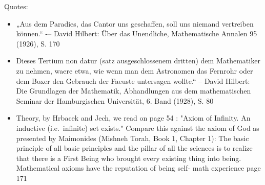 \documentclass[hidelinks]{article}
\theoremstyle{plain}
\theoremstyle{definition}
\theoremstyle{rem}
\begin{document}
Quotes: 
\begin{itemize}
\item „Aus dem Paradies, das Cantor uns geschaffen, soll uns niemand vertreiben können.“ -– David Hilbert: Über das Unendliche, Mathematische Annalen 95 (1926), S. 170 
\item Dieses Tertium non datur (satz ausgeschlossenem dritten) dem Mathematiker zu nehmen, waere etwa, wie wenn man dem Astronomen das Fernrohr oder dem Boxer den Gebrauch der Faeuste untersagen wollte.“ – David Hilbert: Die Grundlagen der Mathematik, Abhandlungen aus dem mathematischen Seminar der Hamburgischen Universität, 6. Band (1928), S. 80
\item Theory, by Hrbacek and Jech, we read on page 54 :
	"Axiom of Infinity. An inductive (i.e.\ infinite) set exists." Compare this against the axiom of God as presented by Maimonides (Mishneh Torah, Book 1, Chapter 1): The basic principle of all basic principles and the pillar of all the sciences is to realize that there is a First Being who brought every existing thing into being.  Mathematical axioms have the reputation of being self- math experience page 171
\end{itemize}

\newpage


\end{document}
